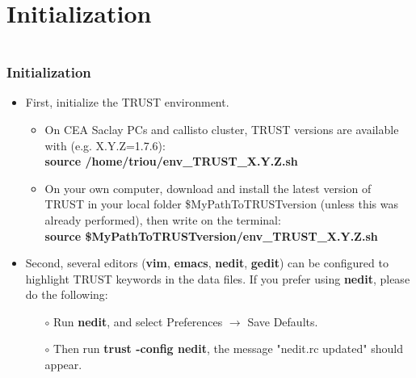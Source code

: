 \documentclass[10pt, hyperref={unicode=true,pdfusetitle, bookmarks=true,bookmarksnumbered=false,bookmarksopen=false, breaklinks=false,pdfborder={0 0 1},backref=true,colorlinks=true,linkcolor=darkblue,pageanchor}]{beamer}
\begin{document}
\section{{\bf{Initialization}}}
\begin{frame}
\begin{columns}[c] 
\tableofcontents[sections={1-9},currentsection, currentsubsection]
\tableofcontents[sections={10-16},currentsection, currentsubsection]
\end{columns}
\end{frame}
\begin{frame}
\frametitle{Initialization}
\begin{block}{}

\begin{itemize}
\item First, initialize the TRUST environment. 
\begin{itemize}
\item On CEA Saclay PCs and callisto cluster, TRUST versions are available with (e.g. X.Y.Z=1.7.6):\\
\textbf{source  /home/triou/env\_TRUST\_X.Y.Z.sh}
\item On your own computer, download and install the latest version of TRUST in your local folder \$MyPathToTRUSTversion (unless this was already performed), then write on the terminal:\\
\textbf{source  \$MyPathToTRUSTversion/env\_TRUST\_X.Y.Z.sh}
\end{itemize}

\item Second, several editors (\textbf{vim}, \textbf{emacs}, \textbf{nedit}, \textbf{gedit}) can be configured to highlight TRUST keywords in the data files. If you prefer using \textbf{nedit}, please do the following:

    \begin{itemize}
    \item [$\circ$] Run \textbf{nedit}, and select Preferences $\rightarrow$ Save Defaults.
    \item [$\circ$] Then run \textbf{trust -config nedit}, the message "nedit.rc updated" should appear.
    \end{itemize}
\end{itemize}

\end{block}
\end{frame}
\end{document}
